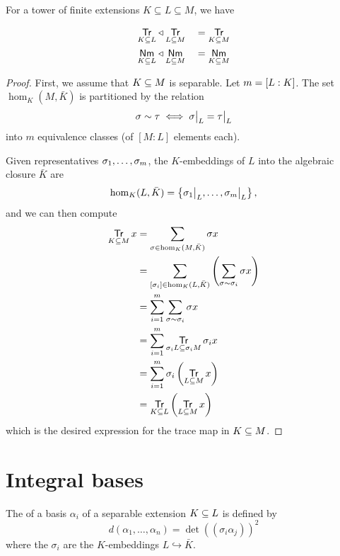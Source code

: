 \begin{theorem}{\label{mul-trace-norm}}
  For a tower of finite extensions $K \subseteq L \subseteq M$, we have

  \begin{alignat*}{2}
    \Trmg L K &\triangleleft \Trmg M L &&= \Trmg M K\\
    \Nmmg L K &\triangleleft \Nmmg M L &&= \Nmmg M K
  \end{alignat*}
\end{theorem}

\begin{proof}
  First, we assume that $\ringExtension M K$ is separable. Let $m =
  \fieldExtensionDegree L K$. The set $\hom_K(M,\bar K)$ is partitioned by the
  relation \[ \sigma \sim \tau \iff \restr{\sigma}{L} = \restr{\tau}{L} \] into
  $m$ equivalence classes (of $[M : L]$ elements each).

  \medskip\noindent
  Given representatives $\iseqi \sigma m$, the $K$-embeddings
  of $L$ into the algebraic closure $\bar K$ are \[\kembk L = \left\{
  \restr{\sigma_1}{L}, \ldots, \restr{\sigma_m}{L} \right\},\] and we can then
  compute
  \begin{align*}
    \Trmg M K x 
          &= \sum_{\sigma \in \kembk{M}} \sigma x \\ 
          &= \sum_{\left[\sigma_i\right] \in \kembk{L}} 
             \left(\sum_{\sigma \sim \sigma_i} \sigma x\right) \\
          &= \sum_{i = 1}^m \sum_{\sigma \sim \sigma_i} \sigma x \\
          &= \sum_{i = 1}^m \Trmg {\sigma_i M}{\sigma_i L} {\sigma_i x} \\
          &= \sum_{i = 1}^m \sigma_i \left(\Trmg M L x\right) \\
          &= \Trmg L K \left(\Trmg M L x\right)
   \end{align*}
   which is the desired expression for the trace map in $\ringExtension M K$.
\end{proof}

\section{Integral bases}

\begin{definition}
  The  of a basis $\alpha_i$ of a separable extension
  $\ringExtension L K$ is defined by
  \[ d(\alpha_1,\ldots,\alpha_n) = \det((\sigma_i\alpha_j))^2 \] where the
  $\sigma_i$ are the $K$-embeddings $L \hookrightarrow {\bar{K}}$.
\end{definition}


